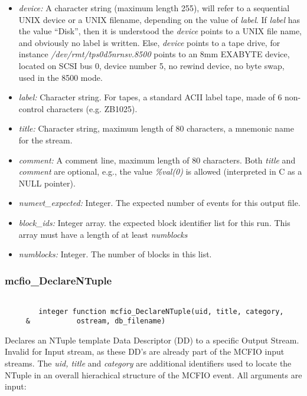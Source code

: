 \begin{itemize} 
\item {\em device:} A  character
 string (maximum length 255), will refer to a  sequential UNIX device or a 
 UNIX filename, depending on the value of {\em label}.  If {\em label} has 
 the value ``Disk'', then it is understood the {\em device} points to 
 a UNIX file name, and obviously no label is written. Else, {\em device} points 
 to a tape drive, for instance {\em /dev/rmt/tps0d5nrnsv.8500} points to 
 an 8mm EXABYTE device, located on SCSI bus 0, device number 5, no rewind 
 device, no byte swap, used in the 8500 mode.  
\item {\em label:} Character string. For tapes, a standard ACII label tape, 
made of 6 non-control characters (e.g. ZB1025). 
\item {\em title:} Character string, maximum length of 80 characters, 
a mnemonic name for the stream.
\item {\em comment:} A comment line, maximum length of 80 characters. Both {\em title }
and {\em comment} are optional, e.g., the value {\em \%val(0)} is allowed
(interpreted in C as a NULL pointer).
\item {\em numevt\_expected:} Integer.  The expected number of events for this
output  file.
\item {\em block\_ids:} Integer array. the expected block identifier list for 
this run. This array must have a length of at least {\em numblocks}
\item {\em numblocks:} Integer. The number of blocks in this list.
\end{itemize}



\subsubsection{mcfio\_DeclareNTuple}

\begin{verbatim}

        integer function mcfio_DeclareNTuple(uid, title, category,
     &           ostream, db_filename)

\end{verbatim}

Declares an NTuple template Data Descriptor (DD) to a specific Output Stream.
Invalid for Input stream, as these DD's are already part of the  MCFIO input
streams.  The {\em uid, title } and {\em category} are additional  identifiers
used to locate the NTuple in an overall hierachical structure  of the MCFIO
event.  All arguments are input:

